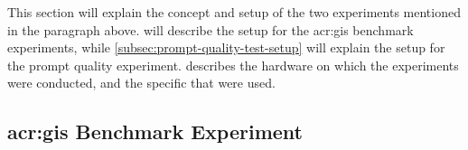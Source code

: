 
This section will explain the concept and setup of the two experiments mentioned in the paragraph above.  will describe the setup for the \acrshort{acr:gis} benchmark experiments, while \autoref{subsec:prompt-quality-test-setup} will explain the setup for the prompt quality experiment.  describes the hardware on which the experiments were conducted, and the specific  that were used.

\subsection[GIS Benchmark Experiment]{\acrshort{acr:gis} Benchmark Experiment}
\label{subsec:benchmarking-setup}


